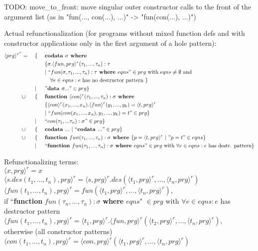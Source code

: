 \documentclass[11pt]{article} %
\begin{document}
TODO: move\_to\_front: move singular outer constructor calls to the front of the argument list (as in "fun(..., con(...), ...)" -> "fun(con(...), ...)")

Actual refunctionalization (for programs without mixed function defs and with constructor applications only in the first argument of a hole pattern):
\begin{alignat*}{3}
\langle prg \rangle^{r''} & = ~&& \{ ~&& \textrm{\textbf{codata }} \sigma \textrm{\textbf{ where }} \\
& && && \{ \sigma .\langle fun, prg \rangle^r (\tau_1, ..., \tau_n): \tau \\
& && && | ~ `` fun (\sigma, \tau_1, ..., \tau_n): \tau \textrm{\textbf{ where }} eqns " \in prg \textrm{ with } eqns \neq \emptyset \textrm{ and } \\
& && &&\quad \forall e \in eqns: e \textrm{ has no destructor pattern }  \} \\
& && | && "\textrm{\textbf{data }} \sigma ..." \in prg \} \\
& \cup && \{ && \textrm{\textbf{function }} \langle con \rangle^r (\tau_1, ..., \tau_n): \sigma \textrm{\textbf{ where }} \\
& && && \{ \langle con \rangle^r (x_1, ..., x_n) .\langle fun \rangle^r (y_1, ..., y_k) = \langle t, prg \rangle^r \\
& && && | ~ `` fun(con(x_1, ..., x_n), y_1, ..., y_k) = t " \in prg \} \\
& && | && `` con(\tau_1, ... \tau_n): \sigma " \in prg \} \\
& \cup && \{ && \textrm{\textbf{codata }} ... ~ | ~ `` \textrm{\textbf{codata }} ... " \in prg \} \\
& \cup && \{ && \textrm{\textbf{function }} fun(\tau_1, ..., \tau_n): \sigma \textrm{\textbf{ where }} \{ p = \langle t, prg \rangle^r ~ | ~ "p = t" \in eqns \} \\
& && | && `` \textrm{\textbf{function }} fun(\tau_1, ..., \tau_n): \sigma \textrm{\textbf{ where }} eqns " \in prg \textrm{ with } \forall e \in eqns: e \textrm{ has destr. pattern}\} 
\end{alignat*}

Refunctionalizing terms: \\
$\langle x, prg \rangle^r = x$ \\
$\langle s.des(t_1, ..., t_n), prg \rangle^r = \langle s, prg \rangle^r .des(\langle t_1, prg \rangle^r, ..., \langle t_n, prg \rangle^r)$ \\
$\langle fun(t_1, ..., t_n), prg \rangle^r = fun(\langle t_1, prg \rangle^r, ..., \langle t_n, prg \rangle^r)$, \\
if ``\textbf{function} $fun(\tau_n, ..., \tau_n): \sigma$ \textbf{where} $eqns$" $\in prg$  with $\forall e \in eqns: e$ has destructor pattern  \\
$\langle fun(t_1, ..., t_n), prg \rangle^r = \langle t_1, prg \rangle^r .\langle fun, prg \rangle^r (\langle t_2, prg \rangle^r, ..., \langle t_n, prg \rangle^r)$, \\
otherwise (all constructor patterns) \\
$\langle con(t_1, ..., t_n), prg \rangle^r = \langle con, prg \rangle^r (\langle t_1, prg \rangle^r, ..., \langle t_n, prg \rangle^r)$ \\
\end{document}
